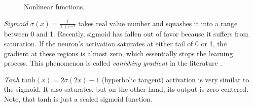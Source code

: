 \begin{figure}[h]
	\begin{center}
		\hspace{0.1em}
		\hspace{0.1em}
	\end{center}
	\caption[Nonlinear functions]{Nonlinear functions.}
	\label{img:nonlinearities}
\end{figure}

\textit{Sigmoid} $\sigma(x) = \frac{1}{1+e^{-x}}$ takes real value number and squashes it
into a range between 0 and 1. Recently, sigmoid has fallen out of favor because it suffers
from saturation. If the neuron's activation saturates at either tail of 0 or 1, the gradient
at these regions is almost zero, which essentially stops the learning process. This phenomenon is called
\textit{vanishing gradient} in the literature \cite{bib:goodfellow2016deep}.

\textit{Tanh} $\textrm{tanh}(x) = 2\sigma(2x) - 1$ (hyperbolic tangent) activation is very
similar to the sigmoid. It also saturates, but on the other hand, its output is zero
centered. Note, that tanh is just a scaled sigmoid function.

